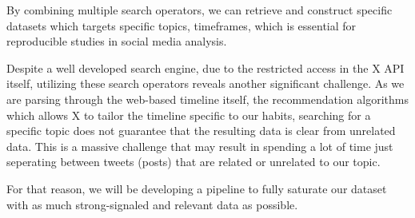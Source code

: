 \documentclass{jabstract}
\begin{document}
\begin{multicols}{2}
By combining multiple search operators, we can retrieve and construct specific datasets which targets specific topics, timeframes, which is essential for reproducible studies in social media analysis. 

Despite a well developed search engine, due to the restricted access in the X API itself, utilizing these search operators reveals another significant challenge. As we are parsing through the web-based timeline itself, the recommendation algorithms which allows X to tailor the timeline specific to our habits, searching for a specific topic does not guarantee that the resulting data is clear from unrelated data. This is a massive challenge that may result in spending a lot of time just seperating between tweets (posts) that are related or unrelated to our topic.

For that reason, we will be developing a pipeline to fully saturate our dataset with as much strong-signaled and relevant data as possible.

\end{multicols}
\end{document}
